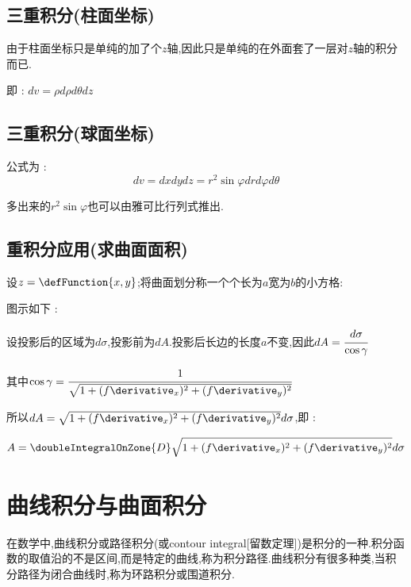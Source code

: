 {{  \subsection{三重积分(柱面坐标)}{
    由于柱面坐标只是单纯的加了个$z$轴,因此只是单纯的在外面套了一层对$z$轴的积分而已.

    即 : $dv = \rho d\rho d\theta dz$
  }%

  \subsection{三重积分(球面坐标)}{
    公式为 :
    $$
      dv = dxdydz = r^2\sin\varphi drd\varphi d\theta
    $$

    多出来的$r^2\sin\varphi$也可以由雅可比行列式推出.
  }%

  \subsection{重积分应用(求曲面面积)}{
    设$z = \defFunction{x,y}$;将曲面划分称一个个长为$a$宽为$b$的小方格:

    图示如下 :
    \begin{center}
    \end{center}

    设投影后的区域为$d\sigma$,投影前为$dA$.投影后长边的长度$a$不变,因此$dA = \cfrac{d\sigma}{\cos\gamma}$

    其中$\cos\gamma = \cfrac{1}{\sqrt{1 + (f\derivative_x)^2 + (f\derivative_y)^2}}$

    所以$dA = \sqrt{1 + (f\derivative_x)^2 + (f\derivative_y)^2}d\sigma$,即 :

    $$
      A = \doubleIntegralOnZone{D}\sqrt{1 + (f\derivative_x)^2 + (f\derivative_y)^2}d\sigma
    $$
  }%


 }%

\section{曲线积分与曲面积分}{
  在数学中,曲线积分或路径积分(或contour integral[留数定理])是积分的一种.积分函数的取值沿的不是区间,而是特定的曲线,称为积分路径.曲线积分有很多种类,当积分路径为闭合曲线时,称为环路积分或围道积分.

}}
